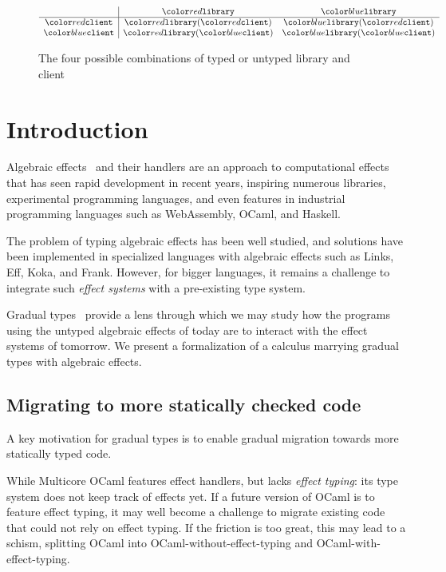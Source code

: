 \begin{figure}
$$
\begin{array}{c|cc}
  & \dhandler & \shandler \\
  \hline
  \dclient & \dhandler(\dclient) & \shandler(\dclient) \\
  \sclient & \dhandler(\sclient) & \shandler(\sclient)
\end{array}
$$
\caption{The four possible combinations of typed or untyped library and client}
\label{fig:migration-example}
\end{figure}

\section{Introduction}

Algebraic effects~\citep{plotkin2001semantics} and their handlers are an
approach to computational effects that has seen rapid development in recent
years, inspiring numerous libraries, experimental programming languages,
and even features in industrial programming languages such as WebAssembly, OCaml,
and Haskell.

The problem of typing algebraic effects has been well studied, and solutions
have been implemented in specialized languages with algebraic effects such as
Links, Eff, Koka, and Frank. However, for bigger languages, it remains a
challenge to integrate such \emph{effect systems} with a pre-existing type
system.

Gradual types~\citep{siek2015} provide a lens through which we may study how
the programs using the untyped algebraic effects of today are to interact with
the effect systems of tomorrow. We present a formalization of a
calculus marrying gradual types with algebraic effects.

\subsection{Migrating to more statically checked code}

A key motivation for gradual types is to enable gradual migration
towards more statically typed code.

While Multicore OCaml features effect handlers, but lacks \emph{effect typing}:
its type system does not keep track of effects yet.
If a future version of OCaml is to feature effect typing,
it may well become a challenge to migrate existing code that could
not rely on effect typing. If the friction is too great, this may lead
to a schism, splitting OCaml into OCaml-without-effect-typing and
OCaml-with-effect-typing.

